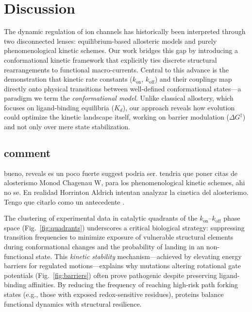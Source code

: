 \documentclass[a4paper,12pt]{article}
\begin{document}
	
	\section{Discussion}
	
	The dynamic regulation of ion channels has historically been interpreted through two disconnected lenses: equilibrium-based allosteric models and purely phenomenological kinetic schemes. Our work bridges this gap by introducing a conformational kinetic framework that explicitly ties discrete structural rearrangements to functional macro-currents. Central to this advance is the demonstration that kinetic rate constants ($k_{\text{on}}$, $k_{\text{off}}$) and their couplings map directly onto physical transitions between well-defined conformational states—a paradigm we term the \textit{conformational model}. Unlike classical allostery, which focuses on ligand-binding equilibria ($K_d$), our approach reveals how evolution could optimize the kinetic landscape itself, working on barrier modulation ($\Delta G^{\ddagger}$) and not only over mere state stabilization. 
	
	\subsection{comment}
		bueno, reveals es un poco fuerte suggest podria ser. 
		tendria que poner citas de alosterismo Monod Chagenau W, para los phenomenological kinetic schemes, ahi no se. 
		En realidad Horrinton  Aldrich intentan analyzar la cinetica del alosterismo. Tengo que citarlo como un antecedente
		. 
	
	
	
	The clustering of experimental data in catalytic quadrants of the $k_{\text{on}}$–$k_{\text{off}}$ phase space (Fig.~\ref{fig:quadrants}) underscores a critical biological strategy: suppressing transition frequencies to minimize exposure of vulnerable structural elements during conformational changes and the probability of landing in an non-functional state. This \textit{kinetic stability} mechanism—achieved by elevating energy barriers for regulated motions—explains why mutations altering rotational gate potentials (Fig.~\ref{fig:barriers}) often prove pathogenic despite preserving ligand-binding affinities. By reducing the frequency of reaching high-risk path forking states (e.g., those with exposed redox-sensitive residues), proteins balance functional dynamics with structural resilience.  
	
\end{document}
